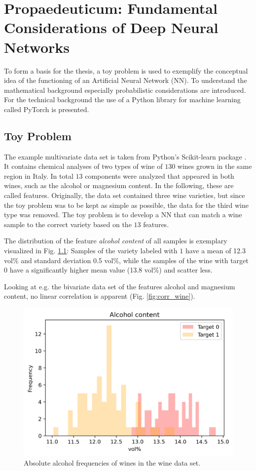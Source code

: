 \chapter{Propaedeuticum: Fundamental Considerations of Deep Neural Networks}
To form a basis for the thesis, a toy problem is used to exemplify the conceptual idea of the functioning of an Artificial Neural Network (NN). To understand the mathematical background especially probabilistic considerations are introduced. For the technical background the use of a Python library for machine learning called PyTorch \cite{Paszke2019Dec} is presented.

\section{Toy Problem}
The example multivariate data set \cite{Dua:2019} is taken from Python's Scikit-learn package \cite{pedregosa2011scikit}. It contains chemical analyses of two types of wine of $130$ wines grown in the same region in Italy. In total $13$ components were analyzed that appeared in both wines, such as the alcohol or magnesium content. In the following, these are called features. Originally, the data set contained three wine varieties, but since the toy problem was to be kept as simple as possible, the data for the third wine type was removed. The toy problem is to develop a NN that can match a wine sample to the correct variety based on the $13$ features.

The distribution of the feature \textit{alcohol content} of all samples is exemplary visualized in Fig. \ref{fig:alcohol_freq}: Samples of the variety labeled with $1$ have a mean of 12.3 vol\% and standard deviation 0.5 vol\%, while the samples of the wine with target $0$ have a significantly higher mean value (13.8 vol\%) and scatter less.

Looking at e.g. the bivariate data set of the features alcohol and magnesium content, no linear correlation is apparent (Fig. \ref{fig:corr_wine}).
\begin{figure}
	\centering
	\includegraphics[scale=0.7]{images/alcohol_freq.png}
\caption{Absolute alcohol frequencies of wines in the wine data set.}
\label{fig:alcohol_freq}
\end{figure}

